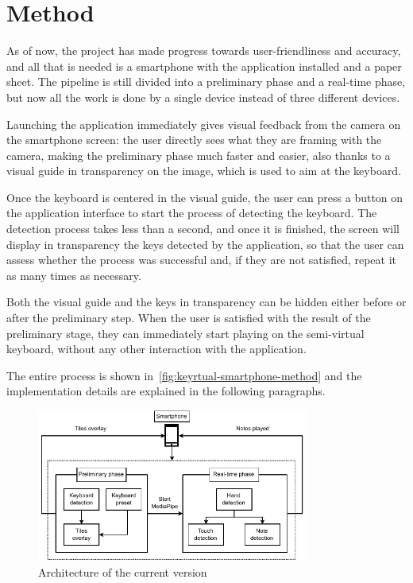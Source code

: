 \section{Method}\label{sec:method}
As of now, the project has made progress towards user-friendliness and accuracy, and all that is needed
is a smartphone with the application installed and a paper sheet.
The pipeline is still divided into a preliminary phase and a real-time phase,
but now all the work is done by a single device instead of three different devices.

Launching the application immediately gives visual feedback from the camera on the smartphone screen:
the user directly sees what they are framing with the camera, making the preliminary phase much faster and easier,
also thanks to a visual guide in transparency on the image, which is used to aim at the keyboard.

Once the keyboard is centered in the visual guide, the user can press a button on the application interface
to start the process of detecting the keyboard.
The detection process takes less than a second, and once it is finished, the screen will display in transparency the
keys detected by the application, so that the user can assess whether the process was successful and,
if they are not satisfied, repeat it as many times as necessary.

Both the visual guide and the keys in transparency can be hidden either before or after the preliminary step.
When the user is satisfied with the result of the preliminary stage, they can immediately start playing on the
semi-virtual keyboard, without any other interaction with the application.

The entire process is shown in~\autoref{fig:keyrtual-smartphone-method}
and the implementation details are explained in the following paragraphs.

\begin{figure}[ht]
	\centering
	\includegraphics[width=0.8\textwidth]{images/application/architecture}
	\caption{Architecture of the current version}
	\label{fig:keyrtual-smartphone-method}
\end{figure}

